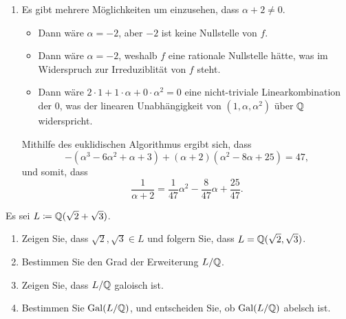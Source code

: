 \begin{solution}
\begin{enumerate}
    \item
      Es gibt mehrere Möglichkeiten um einzusehen, dass $\alpha + 2 \neq 0$.
      \begin{itemize}
        \item
          Dann wäre $\alpha = -2$, aber $-2$ ist keine Nullstelle von $f$.
        \item
          Dann wäre $\alpha = -2$, weshalb $f$ eine rationale Nullstelle hätte, was im Widerspruch zur Irreduziblität von $f$ steht.
        \item
          Dann wäre $2 \cdot 1 + 1 \cdot \alpha + 0 \cdot \alpha^2 = 0$ eine nicht-triviale Linearkombination der $0$, was der linearen Unabhängigkeit von $(1, \alpha, \alpha^2)$ über $\mathbb{Q}$ widerspricht.
      \end{itemize}
      Mithilfe des euklidischen Algorithmus ergibt sich, dass
      \[
        -(\alpha^3 - 6 \alpha^2 + \alpha + 3) + (\alpha + 2)(\alpha^2 - 8 \alpha + 25) = 47,
      \]
      und somit, dass
      \[
          \frac{1}{\alpha + 2}
        = \frac{1}{47} \alpha^2 - \frac{8}{47} \alpha + \frac{25}{47}.  
      \]
  \end{enumerate}
\end{solution}


\begin{question}
  Es sei $L \coloneqq \mathbb{Q}(\sqrt{2} + \sqrt{3})$.
  \begin{enumerate}
    \item
      Zeigen Sie, dass $\sqrt{2}, \sqrt{3} \in L$ und folgern Sie, dass $L = \mathbb{Q}(\sqrt{2}, \sqrt{3})$.
    \item
      Bestimmen Sie den Grad der Erweiterung $L/\mathbb{Q}$.
    \item
      Zeigen Sie, dass $L/\mathbb{Q}$ galoisch ist.
    \item
      Bestimmen Sie $\operatorname{Gal}(L/\mathbb{Q})$, und entscheiden Sie, ob $\operatorname{Gal}(L/\mathbb{Q})$ abelsch ist.
  \end{enumerate}
\end{question}


